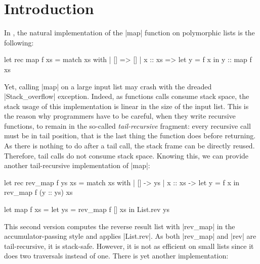 \section{Introduction}

In \OCaml, the natural implementation of the \ocaml|map| function on polymorphic lists is the following:

\begin{Ocaml}
let rec map f xs =
  match xs with
  | [] =>
      []
  | x :: xs =>
      let y = f x in
      y :: map f xs
\end{Ocaml}

Yet, calling \ocaml|map| on a large input list may crash with the dreaded \ocaml|Stack_overflow| exception.
%
Indeed, as functions calls consume stack space, the stack usage of this implementation is linear in the size of the input list.
%
This is the reason why \OCaml programmers have to be careful, when they write recursive functions, to remain in the so-called \emph{tail-recursive} fragment: every recursive call must be in tail position, that is the last thing the function does before returning.
%
As there is nothing to do after a tail call, the stack frame can be directly reused.
%
Therefore, tail calls do not consume stack space.
%
Knowing this, we can provide another tail-recursive implementation of \ocaml|map|:

\begin{minipage}{0.5\linewidth}
\begin{Ocaml}
let rec rev_map f ys xs =
  match xs with
  | [] ->
      ys
  | x :: xs ->
      let y = f x in
      rev_map f (y :: ys) xs
\end{Ocaml}
\end{minipage}
\hfill
\begin{minipage}{0.5\linewidth}
\begin{Ocaml}
let map f xs =
  let ys = rev_map f [] xs in
  List.rev ys
\end{Ocaml}
\end{minipage}

This second version computes the reverse result list with \ocaml|rev_map| in the accumulator-passing style and applies \ocaml|List.rev|.
%
As both \ocaml|rev_map| and \ocaml|rev| are tail-recursive, it is stack-safe.
%
However, it is not as efficient on small lists since it does two traversals instead of one.
%
There is yet another implementation:


